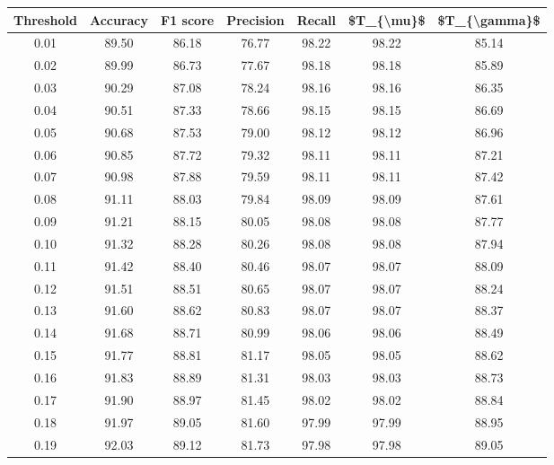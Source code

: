 \begin{tabular}{|c|c|c|c|c|c|c|}
\hline
 Threshold &  Accuracy &  F1 score &  Precision &  Recall &  \$T\_\{\textbackslash mu\}\$ &  \$T\_\{\textbackslash gamma\}\$ \\
\hline
      0.01 &     89.50 &     86.18 &      76.77 &   98.22 &      98.22 &         85.14 \\
      0.02 &     89.99 &     86.73 &      77.67 &   98.18 &      98.18 &         85.89 \\
      0.03 &     90.29 &     87.08 &      78.24 &   98.16 &      98.16 &         86.35 \\
      0.04 &     90.51 &     87.33 &      78.66 &   98.15 &      98.15 &         86.69 \\
      0.05 &     90.68 &     87.53 &      79.00 &   98.12 &      98.12 &         86.96 \\
      0.06 &     90.85 &     87.72 &      79.32 &   98.11 &      98.11 &         87.21 \\
      0.07 &     90.98 &     87.88 &      79.59 &   98.11 &      98.11 &         87.42 \\
      0.08 &     91.11 &     88.03 &      79.84 &   98.09 &      98.09 &         87.61 \\
      0.09 &     91.21 &     88.15 &      80.05 &   98.08 &      98.08 &         87.77 \\
      0.10 &     91.32 &     88.28 &      80.26 &   98.08 &      98.08 &         87.94 \\
      0.11 &     91.42 &     88.40 &      80.46 &   98.07 &      98.07 &         88.09 \\
      0.12 &     91.51 &     88.51 &      80.65 &   98.07 &      98.07 &         88.24 \\
      0.13 &     91.60 &     88.62 &      80.83 &   98.07 &      98.07 &         88.37 \\
      0.14 &     91.68 &     88.71 &      80.99 &   98.06 &      98.06 &         88.49 \\
      0.15 &     91.77 &     88.81 &      81.17 &   98.05 &      98.05 &         88.62 \\
      0.16 &     91.83 &     88.89 &      81.31 &   98.03 &      98.03 &         88.73 \\
      0.17 &     91.90 &     88.97 &      81.45 &   98.02 &      98.02 &         88.84 \\
      0.18 &     91.97 &     89.05 &      81.60 &   97.99 &      97.99 &         88.95 \\
      0.19 &     92.03 &     89.12 &      81.73 &   97.98 &      97.98 &         89.05 \\

\end{tabular}
